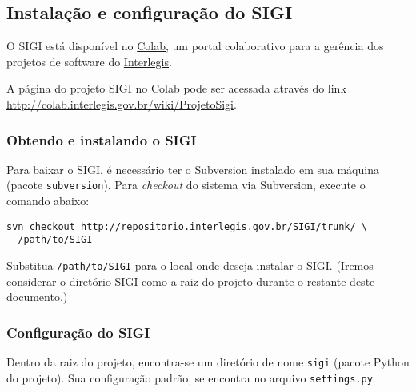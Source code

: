 
\hypertarget{instala-o-e-configura-o-do-sigi}{}
\subsection*{Instalação e configuração do SIGI}

O SIGI está disponível no \href{http://colab.interlegis.gov.br}{Colab},
um portal colaborativo para a gerência dos projetos de software do
\href{http://www.interlegis.gov.br}{Interlegis}.

A página do projeto SIGI no Colab pode ser acessada através do link
\href{http://colab.interlegis.gov.br/wiki/ProjetoSigi}{http://colab.interlegis.gov.br/wiki/ProjetoSigi}.



\hypertarget{obtendo-e-instalando-o-sigi}{}
\subsubsection*{Obtendo e instalando o SIGI}

Para baixar o SIGI, é necessário ter o Subversion instalado em sua
máquina (pacote \texttt{subversion}). Para \emph{checkout} do sistema via
Subversion, execute o comando abaixo:
\begin{verbatim}
svn checkout http://repositorio.interlegis.gov.br/SIGI/trunk/ \
  /path/to/SIGI
\end{verbatim}

Substitua \texttt{/path/to/SIGI} para o local onde deseja instalar o
SIGI. (Iremos considerar o diretório SIGI como a raiz do projeto
durante o restante deste documento.)



\hypertarget{configura-o-do-sigi}{}
\subsubsection*{Configuração do SIGI}

Dentro da raiz do projeto, encontra-se um diretório de nome \texttt{sigi}
(pacote Python do projeto). Sua configuração padrão, se encontra no
arquivo \texttt{settings.py}.

